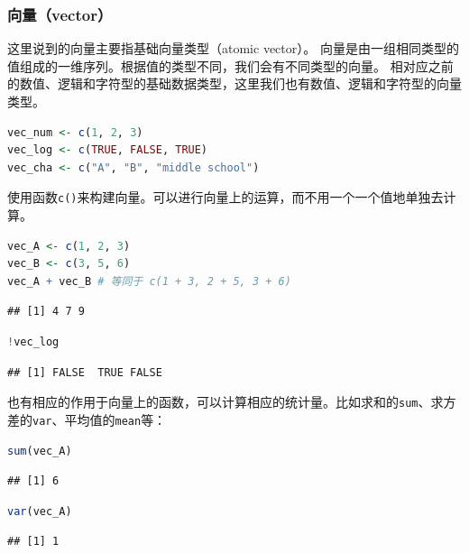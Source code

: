 \documentclass[]{ctexbook}
\newcommand{\passthrough}[1]{#1}
\begin{document}
\hypertarget{ux5411ux91cfvector}{%
\subsubsection{向量（vector）}\label{ux5411ux91cfvector}}

这里说到的向量主要指基础向量类型（atomic vector）。
向量是由一组相同类型的值组成的一维序列。根据值的类型不同，我们会有不同类型的向量。
相对应之前的数值、逻辑和字符型的基础数据类型，这里我们也有数值、逻辑和字符型的向量类型。

\begin{lstlisting}[language=R]
vec_num <- c(1, 2, 3)
vec_log <- c(TRUE, FALSE, TRUE)
vec_cha <- c("A", "B", "middle school")
\end{lstlisting}

使用函数\passthrough{\lstinline!c()!}来构建向量。可以进行向量上的运算，而不用一个一个值地单独去计算。

\begin{lstlisting}[language=R]
vec_A <- c(1, 2, 3)
vec_B <- c(3, 5, 6)
vec_A + vec_B # 等同于 c(1 + 3, 2 + 5, 3 + 6)
\end{lstlisting}

\begin{lstlisting}
## [1] 4 7 9
\end{lstlisting}

\begin{lstlisting}[language=R]
!vec_log
\end{lstlisting}

\begin{lstlisting}
## [1] FALSE  TRUE FALSE
\end{lstlisting}

也有相应的作用于向量上的函数，可以计算相应的统计量。比如求和的\passthrough{\lstinline!sum!}、求方差的\passthrough{\lstinline!var!}、平均值的\passthrough{\lstinline!mean!}等：

\begin{lstlisting}[language=R]
sum(vec_A)
\end{lstlisting}

\begin{lstlisting}
## [1] 6
\end{lstlisting}

\begin{lstlisting}[language=R]
var(vec_A)
\end{lstlisting}

\begin{lstlisting}
## [1] 1
\end{lstlisting}
\end{document}
